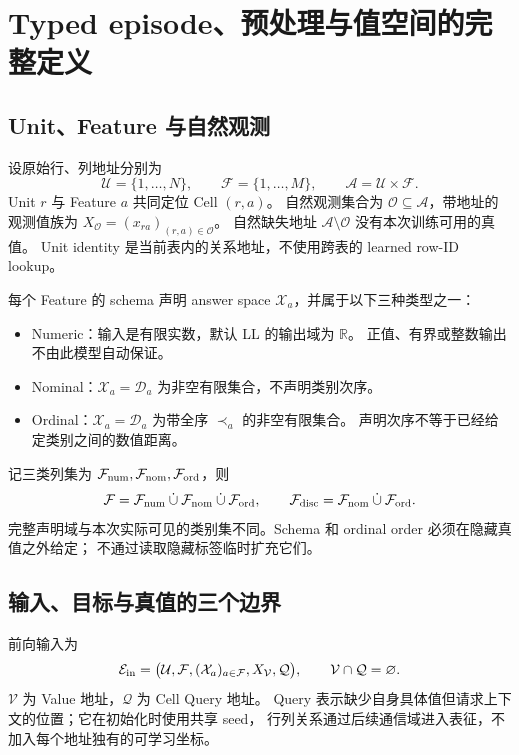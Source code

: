\documentclass[11pt,UTF8,fontset=fandol]{ctexart}
\numberwithin{equation}{section}
\theoremstyle{definition}
\newcommand{\Rset}{\mathcal U}
\newcommand{\Fset}{\mathcal F}
\newcommand{\Oset}{\mathcal O}
\newcommand{\Vset}{\mathcal V}
\newcommand{\Qset}{\mathcal Q}
\newcommand{\Eset}{\mathcal E}
\begin{document}
\section{Typed episode、预处理与值空间的完整定义}
\label{v53:app:input}

\subsection{Unit、Feature 与自然观测}
设原始行、列地址分别为
\[
\Rset=\{1,\ldots,N\},\qquad \Fset=\{1,\ldots,M\},\qquad
\mathcal A=\Rset\times\Fset.
\]
Unit $r$ 与 Feature $a$ 共同定位 Cell $(r,a)$。
自然观测集合为 $\Oset\subseteq\mathcal A$，带地址的观测值族为
$X_{\Oset}=(x_{ra})_{(r,a)\in\Oset}$。
自然缺失地址 $\mathcal A\setminus\Oset$ 没有本次训练可用的真值。
Unit identity 是当前表内的关系地址，不使用跨表的 learned row-ID lookup。

每个 Feature 的 schema 声明 answer space $\mathcal X_a$，并属于以下三种类型之一：
\begin{itemize}
\item Numeric：输入是有限实数，默认 LL 的输出域为 $\mathbb R$。
正值、有界或整数输出不由此模型自动保证。
\item Nominal：$\mathcal X_a=\mathcal D_a$ 为非空有限集合，不声明类别次序。
\item Ordinal：$\mathcal X_a=\mathcal D_a$ 为带全序 $\prec_a$ 的非空有限集合。
声明次序不等于已经给定类别之间的数值距离。
\end{itemize}
记三类列集为 $\Fset_{\rm num},\Fset_{\rm nom},\Fset_{\rm ord}$，则
\[
\Fset=\Fset_{\rm num}\mathbin{\dot\cup}\Fset_{\rm nom}
      \mathbin{\dot\cup}\Fset_{\rm ord},\qquad
\Fset_{\rm disc}=\Fset_{\rm nom}\mathbin{\dot\cup}\Fset_{\rm ord}.
\]
完整声明域与本次实际可见的类别集不同。Schema 和 ordinal order 必须在隐藏真值之外给定；
不通过读取隐藏标签临时扩充它们。

\subsection{输入、目标与真值的三个边界}
\label{sec:P:input}
前向输入为
\begin{equation}
\Eset_{\rm in}=
\bigl(\Rset,\Fset,(\mathcal X_a)_{a\in\Fset},X_{\Vset},\Qset\bigr),
\qquad \Vset\cap\Qset=\varnothing.
\label{eq:P:forward-input}
\end{equation}
$\Vset$ 为 Value 地址，$\Qset$ 为 Cell Query 地址。
Query 表示缺少自身具体值但请求上下文的位置；它在初始化时使用共享 seed，
行列关系通过后续通信域进入表征，不加入每个地址独有的可学习坐标。
\end{document}
